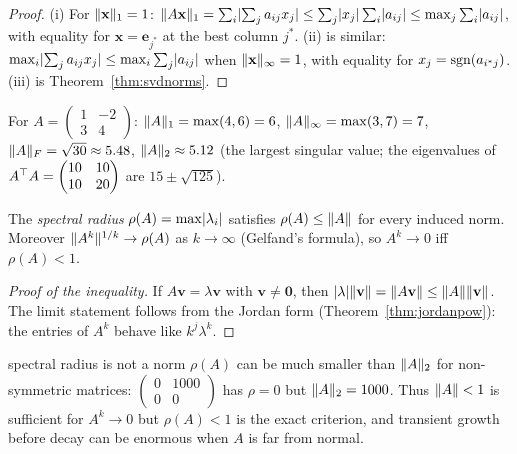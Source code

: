 \begin{proof}
(i) For $\lVert\mathbf{x}\rVert_1=1$: $\lVert A\mathbf{x}\rVert_1=\sum_i\lvert\sum_ja_{ij}x_j\rvert\le\sum_j\lvert x_j\rvert\sum_i\lvert a_{ij}\rvert\le\max_j\sum_i\lvert a_{ij}\rvert$, with equality for $\mathbf{x}=\mathbf{e}_{j^*}$ at the best column $j^*$. (ii) is similar: $\max_i\lvert\sum_ja_{ij}x_j\rvert\le\max_i\sum_j\lvert a_{ij}\rvert$ when $\lVert\mathbf{x}\rVert_\infty=1$, with equality for $x_j=\operatorname{sgn}(a_{i^*j})$. (iii) is Theorem~\ref{thm:svdnorms}.
\end{proof}

\begin{example}
For $A=\begin{pmatrix}1&-2\\3&4\end{pmatrix}$: $\lVert A\rVert_1=\max(4,6)=6$, $\lVert A\rVert_\infty=\max(3,7)=7$, $\lVert A\rVert_F=\sqrt{30}\approx5.48$, $\lVert A\rVert_2\approx5.12$ (the largest singular value; the eigenvalues of $A^{\top} A=\begin{pmatrix}10&10\\10&20\end{pmatrix}$ are $15\pm\sqrt{125}$).
\end{example}

\begin{theorem}\label{thm:specrad}
The \emph{spectral radius} $\rho(A)=\max\lvert\lambda_i\rvert$ satisfies $\rho(A)\le\lVert A\rVert$ for every induced norm. Moreover $\lVert A^k\rVert^{1/k}\to\rho(A)$ as $k\to\infty$ (Gelfand's formula), so $A^k\to0$ iff $\rho(A)<1$.
\end{theorem}

\begin{proof}[Proof of the inequality]
If $A\mathbf{v}=\lambda\mathbf{v}$ with $\mathbf{v}\ne\mathbf{0}$, then $\lvert\lambda\rvert\lVert\mathbf{v}\rVert=\lVert A\mathbf{v}\rVert\le\lVert A\rVert\lVert\mathbf{v}\rVert$. The limit statement follows from the Jordan form (Theorem~\ref{thm:jordanpow}): the entries of $A^k$ behave like $k^j\lambda^k$.
\end{proof}

\begin{pitfall}{spectral radius is not a norm}
$\rho(A)$ can be much smaller than $\lVert A\rVert_2$ for non-symmetric matrices: $\begin{pmatrix}0&1000\\0&0\end{pmatrix}$ has $\rho=0$ but $\lVert A\rVert_2=1000$. Thus $\lVert A\rVert<1$ is sufficient for $A^k\to0$ but $\rho(A)<1$ is the exact criterion, and transient growth before decay can be enormous when $A$ is far from normal.
\end{pitfall}

